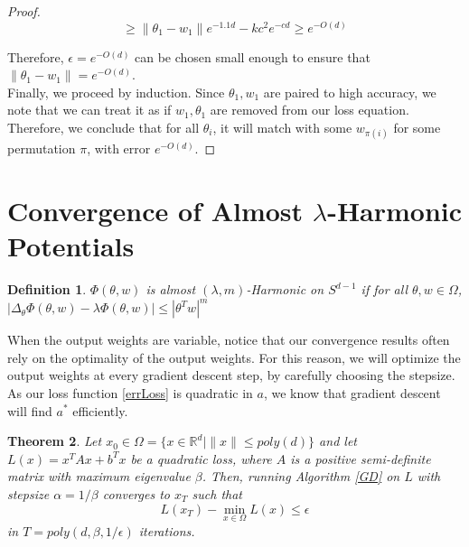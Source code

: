 \documentclass{article}
\newtheorem{theorem}{Theorem}[section]
\newtheorem{definition}[theorem]{Definition}
\newcommand{\R}{{\mathbb{R}}}
\newcommand{\Authornote}[2]{{\sf\color{red}{[#1: #2]}}}
\newcommand{\Authornote}[2]{}
\newcommand{\Rnote}{\Authornote{R}}
\begin{document}
\begin{proof}
\[\geq \|\theta_1-w_1\|e^{-1.1d} - kc^2e^{-cd} \geq e^{-O(d)}\]

Therefore, $\epsilon = e^{-O(d)}$ can be chosen small enough to ensure that $\|\theta_1 - w_1\| = e^{-O(d)}$. \\

Finally, we proceed by induction. Since $\theta_1, w_1$ are paired to high accuracy, we note that we can treat it as if $w_1, \theta_1$ are removed from our loss equation. Therefore, we conclude that for all $\theta_i$, it will match with some $w_{\pi(i)}$ for some permutation $\pi$, with error $e^{-O(d)}$. 

\end{proof}




\section{Convergence of Almost $\lambda$-Harmonic Potentials}\label{App:EigenFunc}

\begin{definition}
$\Phi(\theta, w)$ is almost $(\lambda,m)$-Harmonic on $S^{d-1}$ if for all $\theta, w\in \Omega$, $|\Delta_{\theta}\Phi(\theta, w) - \lambda \Phi (\theta,w)| \leq |\theta^Tw|^m$ 
\end{definition}
\Rnote{Not sure if there is a nice general definition to be honest...to be discussed}

When the output weights are variable, notice that our convergence results often rely on the optimality of the output weights. For this reason, we will optimize the output weights at every gradient descent step, by carefully choosing the stepsize. As our loss function \eqref{errLoss} is quadratic in $a$, we know that gradient descent will find $a^*$ efficiently. 
%
\begin{theorem}\cite{nesterov2013introductory}\label{quadConverge}
Let $x_0 \in \Omega = \{ x \in \R^d | \|x \| \leq poly(d)\}$ and let $L(x) = x^TAx + b^Tx$ be a quadratic loss, where $A$ is a positive semi-definite matrix with maximum eigenvalue $\beta$. Then, running Algorithm \ref{GD} on $L$ with stepsize $\alpha = 1/\beta$ converges to $x_T$ such that \[L(x_T) - \min_{x \in \Omega} L(x) \leq \epsilon\] in $T = poly(d, \beta, 1/\epsilon)$ iterations. 
\end{theorem} 
\end{document}
